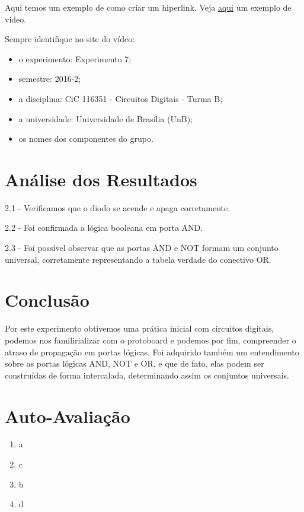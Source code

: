 \documentclass[12pt]{article}
\begin{document}
Aqui temos um exemplo de como criar um hiperlink. Veja
\href{https://www.youtube.com/watch?v=EcNxjxKRQ6E}{aqui} um exemplo de vídeo.

Sempre identifique no site do vídeo:
\begin{itemize}
    \item o experimento: Experimento 7;
    \item semestre: 2016-2;
    \item a disciplina: CiC 116351 - Circuitos Digitais - Turma B;
    \item a universidade: Universidade de Brasília (UnB);
    \item os nomes dos componentes do grupo.
\end{itemize}

\section{Análise dos Resultados}
\label{sec:Resultados}

2.1 - Verificamos que o diodo se acende e apaga corretamente.

2.2 - Foi confirmada a lógica booleana em porta AND.

2.3 -  Foi possível observar que as portas AND e NOT formam um conjunto universal, corretamente representando a tabela verdade do conectivo OR.


\section{Conclusão}
\label{sec:Conclusao}
	Por este experimento obtivemos uma prática inicial com circuitos digitais, podemos nos familirializar com o protoboard e podemos por fim, compreender o atraso de propagação em portas  lógicas. 
	Foi adquirido também um entendimento sobre as portas lógicas AND, NOT e OR, e que de fato, elas podem ser construídas de forma intercalada, determinando assim os conjuntos universais.






\newpage 
\section*{Auto-Avaliação}

\begin{enumerate}
    \item a
    \item c
    \item b
    \item d
\end{enumerate}
\end{document}
